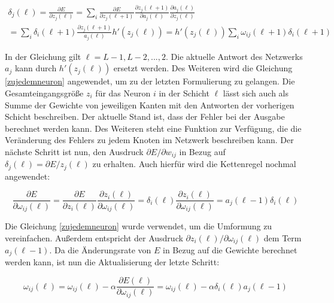 \begin{equation}
\begin{split}
	\delta_j(\ell) = \frac{\partial E}{\partial z_j(\ell)} = \sum_{i}\frac{\partial E}{\partial z_j(\ell + 1)} \frac{\partial z_j(\ell + 1)}{\partial a_j(\ell)}\frac{\partial a_j(\ell)}{\partial z_j(\ell)}  \\
	= \sum_{i}\delta_i(\ell + 1) \frac{\partial z_j(\ell + 1)}{a_j(\ell)}h'(z_j(\ell)) = h'(z_j(\ell))\sum_{i}\omega_{ij}(\ell + 1)\delta_i(\ell + 1)
\end{split}
\end{equation}

In der Gleichung gilt $\ell = L-1, L-2,...,2$. Die aktuelle Antwort des Netzwerks $a_j$ kann durch $h'(z_j(\ell))$ ersetzt werden. Des Weiteren wird die Gleichung \ref{zujedemneuron} angewendet, um zu der letzten Formulierung zu gelangen. Die Gesamteingangsgröße $z_i$ für das Neuron $i$ in der Schicht $\ell$ lässt sich auch als Summe der Gewichte von jeweiligen Kanten mit den Antworten der vorherigen Schicht beschreiben.
Der aktuelle Stand ist, dass der Fehler bei der Ausgabe berechnet werden kann. Des Weiteren steht eine Funktion zur Verfügung, die die Veränderung des Fehlers zu jedem Knoten im Netzwerk beschreiben kann. Der nächste Schritt ist nun, den Ausdruck $\partial E/\partial w_{ij}$ in Bezug auf $\delta_j(\ell)=\partial E/z_j(\ell)$ zu erhalten. Auch hierfür wird die Kettenregel nochmal angewendet:

\begin{equation}
\frac{\partial E}{\partial \omega_{ij}(\ell)} = \frac{\partial E}{\partial z_i(\ell)}\frac{\partial z_i(\ell)}{\partial \omega_{ij}(\ell)} = \delta_i(\ell)\frac{\partial z_i(\ell)}{\partial \omega_{ij}(\ell)} = a_j(\ell - 1)\delta_i(\ell)
\end{equation}

Die Gleichung \ref{zujedemneuron} wurde verwendet, um die Umformung zu vereinfachen. Außerdem entspricht der Ausdruck $\partial z_i(\ell)/\partial \omega_{ij}(\ell)$ dem Term $a_j(\ell - 1)$. 
Da die Änderungsrate von $E$ in Bezug auf die Gewichte berechnet werden kann, ist nun die Aktualisierung der letzte Schritt:




\begin{equation}
\omega_{ij}(\ell) = \omega_{ij}(\ell) - \alpha\frac{\partial E(\ell)}{\partial \omega_{ij}(\ell)} = \omega_{ij}(\ell) - \alpha\delta_i(\ell)a_j(\ell - 1)
\end{equation}

